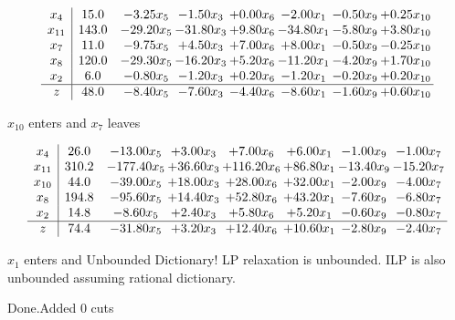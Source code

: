 \documentclass[8pt]{article}
\begin{document}
 \[\begin{array}{c| c c@{\hskip 2pt} c@{\hskip 2pt} c@{\hskip 2pt} c@{\hskip 2pt} c@{\hskip 2pt} c@{\hskip 2pt} }
 x_{4}   &  15.0 & -3.25 x_{5} & -1.50 x_{3} & +  0.00 x_{6} & -2.00 x_{1} & -0.50 x_{9} & +  0.25 x_{10}\\
 x_{11}   &  143.0 & -29.20 x_{5} & -31.80 x_{3} & +  9.80 x_{6} & -34.80 x_{1} & -5.80 x_{9} & +  3.80 x_{10}\\
 x_{7}   &  11.0 & -9.75 x_{5} & +  4.50 x_{3} & +  7.00 x_{6} & +  8.00 x_{1} & -0.50 x_{9} & -0.25 x_{10}\\
 x_{8}   &  120.0 & -29.30 x_{5} & -16.20 x_{3} & +  5.20 x_{6} & -11.20 x_{1} & -4.20 x_{9} & +  1.70 x_{10}\\
 x_{2}   &  6.0 & -0.80 x_{5} & -1.20 x_{3} & +  0.20 x_{6} & -1.20 x_{1} & -0.20 x_{9} & +  0.20 x_{10}\\
\hline
z    &  48.0 & -8.40 x_{5} & -7.60 x_{3} & -4.40 x_{6} & -8.60 x_{1} & -1.60 x_{9} & +  0.60 x_{10}\\
\end{array}\]


 $ x_{10} $ enters and $ x_{7} $ leaves 

 \[\begin{array}{c| c c@{\hskip 2pt} c@{\hskip 2pt} c@{\hskip 2pt} c@{\hskip 2pt} c@{\hskip 2pt} c@{\hskip 2pt} }
 x_{4}   &  26.0 & -13.00 x_{5} & +  3.00 x_{3} & +  7.00 x_{6} & +  6.00 x_{1} & -1.00 x_{9} & -1.00 x_{7}\\
 x_{11}   &  310.2 & -177.40 x_{5} & + 36.60 x_{3} & + 116.20 x_{6} & + 86.80 x_{1} & -13.40 x_{9} & -15.20 x_{7}\\
 x_{10}   &  44.0 & -39.00 x_{5} & + 18.00 x_{3} & + 28.00 x_{6} & + 32.00 x_{1} & -2.00 x_{9} & -4.00 x_{7}\\
 x_{8}   &  194.8 & -95.60 x_{5} & + 14.40 x_{3} & + 52.80 x_{6} & + 43.20 x_{1} & -7.60 x_{9} & -6.80 x_{7}\\
 x_{2}   &  14.8 & -8.60 x_{5} & +  2.40 x_{3} & +  5.80 x_{6} & +  5.20 x_{1} & -0.60 x_{9} & -0.80 x_{7}\\
\hline
z    &  74.4 & -31.80 x_{5} & +  3.20 x_{3} & + 12.40 x_{6} & + 10.60 x_{1} & -2.80 x_{9} & -2.40 x_{7}\\
\end{array}\]


 $ x_{1} $ enters and Unbounded Dictionary!
 LP relaxation is unbounded. ILP is also unbounded assuming rational dictionary. 

Done.Added 0 cuts 
\end{document}
